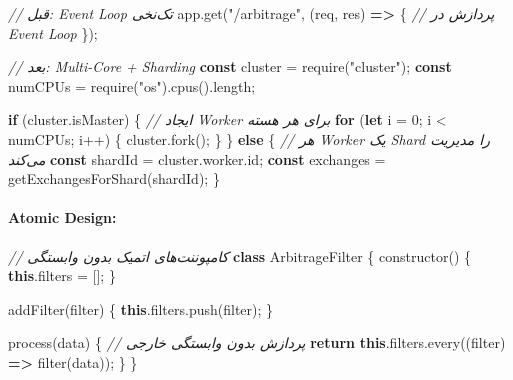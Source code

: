\documentclass[
]{article}
\newenvironment{Shaded}{}{}
\newcommand{\AttributeTok}[1]{\textcolor[rgb]{0.49,0.56,0.16}{#1}}
\newcommand{\BuiltInTok}[1]{\textcolor[rgb]{0.00,0.50,0.00}{#1}}
\newcommand{\CommentTok}[1]{\textcolor[rgb]{0.38,0.63,0.69}{\textit{#1}}}
\newcommand{\ControlFlowTok}[1]{\textcolor[rgb]{0.00,0.44,0.13}{\textbf{#1}}}
\newcommand{\DecValTok}[1]{\textcolor[rgb]{0.25,0.63,0.44}{#1}}
\newcommand{\FunctionTok}[1]{\textcolor[rgb]{0.02,0.16,0.49}{#1}}
\newcommand{\KeywordTok}[1]{\textcolor[rgb]{0.00,0.44,0.13}{\textbf{#1}}}
\newcommand{\NormalTok}[1]{#1}
\newcommand{\OperatorTok}[1]{\textcolor[rgb]{0.40,0.40,0.40}{#1}}
\newcommand{\PreprocessorTok}[1]{\textcolor[rgb]{0.74,0.48,0.00}{#1}}
\newcommand{\StringTok}[1]{\textcolor[rgb]{0.25,0.44,0.63}{#1}}
\begin{document}
\begin{Shaded}
\begin{Highlighting}[]
\CommentTok{// قبل: Event Loop تک‌نخی}
\NormalTok{app}\OperatorTok{.}\FunctionTok{get}\NormalTok{(}\StringTok{"/arbitrage"}\OperatorTok{,}\NormalTok{ (req}\OperatorTok{,}\NormalTok{ res) }\KeywordTok{=\textgreater{}}\NormalTok{ \{}
  \CommentTok{// پردازش در Event Loop}
\NormalTok{\})}\OperatorTok{;}

\CommentTok{// بعد: Multi{-}Core + Sharding}
\KeywordTok{const}\NormalTok{ cluster }\OperatorTok{=} \PreprocessorTok{require}\NormalTok{(}\StringTok{"cluster"}\NormalTok{)}\OperatorTok{;}
\KeywordTok{const}\NormalTok{ numCPUs }\OperatorTok{=} \PreprocessorTok{require}\NormalTok{(}\StringTok{"os"}\NormalTok{)}\OperatorTok{.}\FunctionTok{cpus}\NormalTok{()}\OperatorTok{.}\AttributeTok{length}\OperatorTok{;}

\ControlFlowTok{if}\NormalTok{ (cluster}\OperatorTok{.}\AttributeTok{isMaster}\NormalTok{) \{}
  \CommentTok{// ایجاد Worker برای هر هسته}
  \ControlFlowTok{for}\NormalTok{ (}\KeywordTok{let}\NormalTok{ i }\OperatorTok{=} \DecValTok{0}\OperatorTok{;}\NormalTok{ i }\OperatorTok{\textless{}}\NormalTok{ numCPUs}\OperatorTok{;}\NormalTok{ i}\OperatorTok{++}\NormalTok{) \{}
\NormalTok{    cluster}\OperatorTok{.}\FunctionTok{fork}\NormalTok{()}\OperatorTok{;}
\NormalTok{  \}}
\NormalTok{\} }\ControlFlowTok{else}\NormalTok{ \{}
  \CommentTok{// هر Worker یک Shard را مدیریت می‌کند}
  \KeywordTok{const}\NormalTok{ shardId }\OperatorTok{=}\NormalTok{ cluster}\OperatorTok{.}\AttributeTok{worker}\OperatorTok{.}\AttributeTok{id}\OperatorTok{;}
  \KeywordTok{const}\NormalTok{ exchanges }\OperatorTok{=} \FunctionTok{getExchangesForShard}\NormalTok{(shardId)}\OperatorTok{;}
\NormalTok{\}}
\end{Highlighting}
\end{Shaded}

\paragraph{Atomic Design:}\label{atomic-design-1}

\begin{Shaded}
\begin{Highlighting}[]
\CommentTok{// کامپوننت‌های اتمیک بدون وابستگی}
\KeywordTok{class}\NormalTok{ ArbitrageFilter \{}
  \FunctionTok{constructor}\NormalTok{() \{}
    \KeywordTok{this}\OperatorTok{.}\AttributeTok{filters} \OperatorTok{=}\NormalTok{ []}\OperatorTok{;}
\NormalTok{  \}}

  \FunctionTok{addFilter}\NormalTok{(filter) \{}
    \KeywordTok{this}\OperatorTok{.}\AttributeTok{filters}\OperatorTok{.}\FunctionTok{push}\NormalTok{(filter)}\OperatorTok{;}
\NormalTok{  \}}

  \BuiltInTok{process}\NormalTok{(data) \{}
    \CommentTok{// پردازش بدون وابستگی خارجی}
    \ControlFlowTok{return} \KeywordTok{this}\OperatorTok{.}\AttributeTok{filters}\OperatorTok{.}\FunctionTok{every}\NormalTok{((filter) }\KeywordTok{=\textgreater{}} \FunctionTok{filter}\NormalTok{(data))}\OperatorTok{;}
\NormalTok{  \}}
\NormalTok{\}}
\end{Highlighting}
\end{Shaded}
\end{document}
